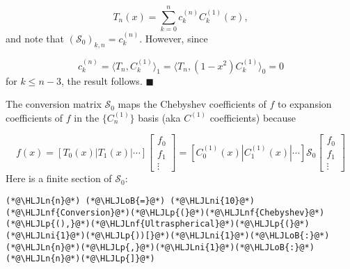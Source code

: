 \documentclass[12pt,landscape]{article}
\newcommand{\HLJLn}[1]{#1}
\newcommand{\HLJLnf}[1]{\textcolor[RGB]{66,102,213}{#1}}
\newcommand{\HLJLni}[1]{\textcolor[RGB]{59,151,46}{#1}}
\newcommand{\HLJLoB}[1]{\textcolor[RGB]{102,102,102}{\textbf{#1}}}
\newcommand{\HLJLp}[1]{#1}
\begin{document}
{\[
T_n(x) = \sum_{k=0}^{n} c_k^{(n)} C_k^{(1)}(x),
\]
and note that $\left(\mathcal{S}_0\right)_{k,n} = c_k^{(n)}$. However, since

\[
c_k^{(n)} = \langle  T_n,  C^{(1)}_k \rangle_{1} = \langle  T_n,  (1-x^2)C^{(1)}_k \rangle_{0} = 0
\]
for $k \leq n-3$, the result follows.  $\blacksquare$

The conversion matrix $\mathcal{S}_0$ maps the Chebyshev coefficients of $f$ to expansion coefficients of $f$ in the $\{C_n^{(1)}\}$ basis (aka $C^{(1)}$ coefficients) because

\[
f(x) = \left[ T_0(x) | T_1(x) | \cdots  \right]
\begin{bmatrix}
f_0 \\
f_1 \\
\vdots
\end{bmatrix}  =  \left[ C^{(1)}_0(x) | C^{(1)}_1(x) | \cdots  \right]\mathcal{S}_0\begin{bmatrix}
f_0 \\
f_1 \\
\vdots
\end{bmatrix}
\]
Here is a finite section of $\mathcal{S}_0$:


\begin{lstlisting}
(*@\HLJLn{n}@*) (*@\HLJLoB{=}@*) (*@\HLJLni{10}@*)
(*@\HLJLnf{Conversion}@*)(*@\HLJLp{(}@*)(*@\HLJLnf{Chebyshev}@*)(*@\HLJLp{(),}@*)(*@\HLJLnf{Ultraspherical}@*)(*@\HLJLp{(}@*)(*@\HLJLni{1}@*)(*@\HLJLp{))[}@*)(*@\HLJLni{1}@*)(*@\HLJLoB{:}@*)(*@\HLJLn{n}@*)(*@\HLJLp{,}@*)(*@\HLJLni{1}@*)(*@\HLJLoB{:}@*)(*@\HLJLn{n}@*)(*@\HLJLp{]}@*)
\end{lstlisting}

}
\end{document}
